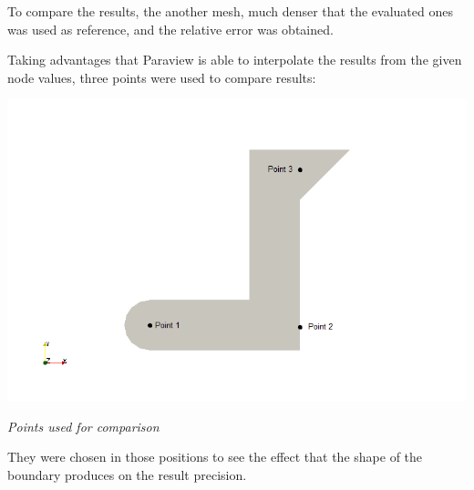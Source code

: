 \documentclass[paper=a4, fontsize=11pt]{article} %
\numberwithin{equation}{section} %
\numberwithin{figure}{section} %
\numberwithin{table}{section} %
\begin{document}
To compare the results, the another mesh, much denser that the evaluated ones was used as reference, and the relative error was obtained.

Taking advantages that Paraview is able to interpolate the results from the given node values, three points were used to compare results:

\begin{center}
\includegraphics[scale=0.7]{points}

\textit{Points used for comparison}
\end{center}

They were chosen in those positions to see the effect that the shape of the boundary produces on the result precision.\\
\end{document}
